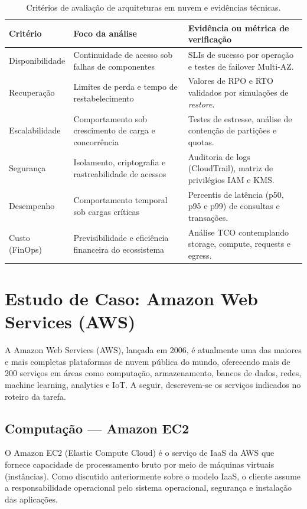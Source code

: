 \documentclass[11pt,a4paper]{article}
\begin{document}
\begin{table}[H]\centering\caption{Critérios de avaliação de arquiteturas em nuvem e evidências técnicas.}
\label{tab:criterios_avaliacao}
\small\begin{tabularx}{\textwidth}{@{}p{2.2cm}Y Y@{}}\toprule
\textbf{Critério} & \textbf{Foco da análise} & \textbf{Evidência ou métrica de verificação}\\\midrule
Disponibilidade & Continuidade de acesso sob falhas de componentes & SLIs de sucesso por operação e testes de failover Multi-AZ.\\
Recuperação & Limites de perda e tempo de restabelecimento & Valores de RPO e RTO validados por simulações de \emph{restore}.\\
Escalabilidade & Comportamento sob crescimento de carga e concorrência & Testes de estresse, análise de contenção de partições e quotas.\\
Segurança & Isolamento, criptografia e rastreabilidade de acessos & Auditoria de logs (CloudTrail), matriz de privilégios IAM e KMS.\\
Desempenho & Comportamento temporal sob cargas críticas & Percentis de latência (p50, p95 e p99) de consultas e transações.\\
Custo (FinOps) & Previsibilidade e eficiência financeira do ecossistema & Análise TCO contemplando storage, compute, requests e egress.\\\bottomrule
\end{tabularx}\end{table}

\clearpage


\section{Estudo de Caso: Amazon Web Services (AWS)}\label{sec:aws}
A Amazon Web Services (AWS), lançada em 2006, é atualmente uma das maiores e mais completas plataformas de nuvem pública do mundo, oferecendo mais de 200 serviços em áreas como computação, armazenamento, bancos de dados, redes, machine learning, analytics e IoT. A seguir, descrevem-se os serviços indicados no roteiro da tarefa.

\subsection{Computação --- Amazon EC2}
O Amazon EC2 (Elastic Compute Cloud) é o serviço de IaaS da AWS que fornece capacidade de processamento bruto por meio de máquinas virtuais (instâncias). Como discutido anteriormente sobre o modelo IaaS, o cliente assume a responsabilidade operacional pelo sistema operacional, segurança e instalação das aplicações.
\end{document}
